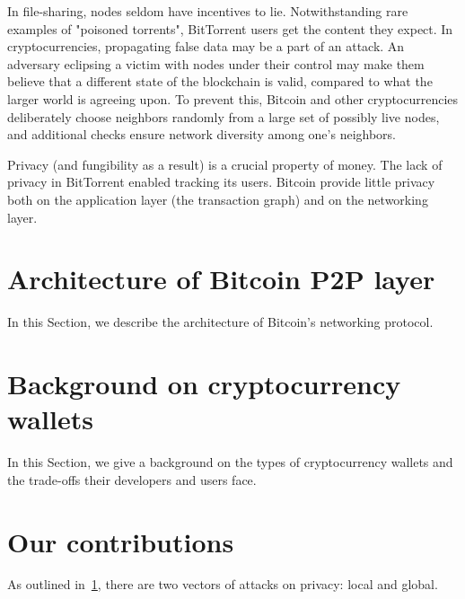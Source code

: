 In file-sharing, nodes seldom have incentives to lie.
Notwithstanding rare examples of "poisoned torrents", BitTorrent users get the content they expect.
In cryptocurrencies, propagating false data may be a part of an attack.
An adversary eclipsing a victim with nodes under their control may make them believe that a different state of the blockchain is valid, compared to what the larger world is agreeing upon.
To prevent this, Bitcoin and other cryptocurrencies deliberately choose neighbors randomly from a large set of possibly live nodes, and additional checks ensure network diversity among one's neighbors.

Privacy (and fungibility as a result) is a crucial property of money.
The lack of privacy in BitTorrent enabled tracking its users.
Bitcoin provide little privacy both on the application layer (the transaction graph) and on the networking layer.






\section{Architecture of Bitcoin P2P layer}
\label{sec:C02_S2_Architecture_Bitcoin_P2P}

In this Section, we describe the architecture of Bitcoin's networking protocol.

\section{Background on cryptocurrency wallets}
\label{sec:C02_S3_Background_Wallets}

In this Section, we give a background on the types of cryptocurrency wallets and the trade-offs their developers and users face.


\section{Our contributions}
\label{sec:C02_S4_Our_Contributions}

As outlined in~\ref{sec:C02_S2_Architecture_Bitcoin_P2P}, there are two vectors of attacks on privacy: local and global.
